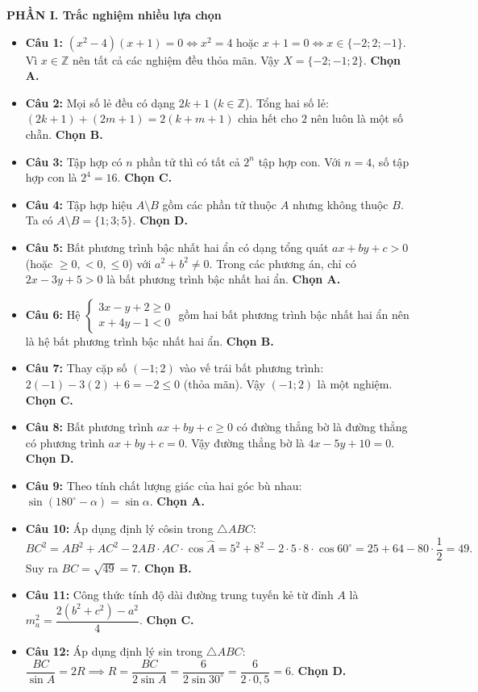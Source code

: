 \documentclass[12pt,a4paper]{article}
\begin{document}
\textbf{PHẦN I. Trắc nghiệm nhiều lựa chọn}
\begin{itemize}[leftmargin=0.6cm, itemsep=1.5pt, topsep=1pt]
    \item \textbf{Câu 1:} $(x^2 - 4)(x + 1) = 0 \iff x^2 = 4$ hoặc $x + 1 = 0 \iff x \in \{-2; 2; -1\}$. Vì $x \in \mathbb{Z}$ nên tất cả các nghiệm đều thỏa mãn. Vậy $X = \{-2; -1; 2\}$. \textbf{Chọn A.}
    \item \textbf{Câu 2:} Mọi số lẻ đều có dạng $2k + 1$ ($k \in \mathbb{Z}$). Tổng hai số lẻ: $(2k + 1) + (2m + 1) = 2(k + m + 1)$ chia hết cho $2$ nên luôn là một số chẵn. \textbf{Chọn B.}
    \item \textbf{Câu 3:} Tập hợp có $n$ phần tử thì có tất cả $2^n$ tập hợp con. Với $n = 4$, số tập hợp con là $2^4 = 16$. \textbf{Chọn C.}
    \item \textbf{Câu 4:} Tập hợp hiệu $A \setminus B$ gồm các phần tử thuộc $A$ nhưng không thuộc $B$. Ta có $A \setminus B = \{1; 3; 5\}$. \textbf{Chọn D.}
    \item \textbf{Câu 5:} Bất phương trình bậc nhất hai ẩn có dạng tổng quát $ax + by + c > 0$ (hoặc $\ge 0, < 0, \le 0$) với $a^2 + b^2 \ne 0$. Trong các phương án, chỉ có $2x - 3y + 5 > 0$ là bất phương trình bậc nhất hai ẩn. \textbf{Chọn A.}
    \item \textbf{Câu 6:} Hệ $\begin{cases} 3x - y + 2 \ge 0 \\ x + 4y - 1 < 0 \end{cases}$ gồm hai bất phương trình bậc nhất hai ẩn nên là hệ bất phương trình bậc nhất hai ẩn. \textbf{Chọn B.}
    \item \textbf{Câu 7:} Thay cặp số $(-1; 2)$ vào vế trái bất phương trình: $2(-1) - 3(2) + 6 = -2 \le 0$ (thỏa mãn). Vậy $(-1; 2)$ là một nghiệm. \textbf{Chọn C.}
    \item \textbf{Câu 8:} Bất phương trình $ax + by + c \ge 0$ có đường thẳng bờ là đường thẳng có phương trình $ax + by + c = 0$. Vậy đường thẳng bờ là $4x - 5y + 10 = 0$. \textbf{Chọn D.}
    \item \textbf{Câu 9:} Theo tính chất lượng giác của hai góc bù nhau: $\sin(180^\circ - \alpha) = \sin \alpha$. \textbf{Chọn A.}
    \item \textbf{Câu 10:} Áp dụng định lý côsin trong $\triangle ABC$:
    \[
    BC^2 = AB^2 + AC^2 - 2 AB \cdot AC \cdot \cos \widehat{A} = 5^2 + 8^2 - 2 \cdot 5 \cdot 8 \cdot \cos 60^\circ = 25 + 64 - 80 \cdot \dfrac{1}{2} = 49.
    \]
    Suy ra $BC = \sqrt{49} = 7$. \textbf{Chọn B.}
    \item \textbf{Câu 11:} Công thức tính độ dài đường trung tuyến kẻ từ đỉnh $A$ là $m_a^2 = \dfrac{2(b^2 + c^2) - a^2}{4}$. \textbf{Chọn C.}
    \item \textbf{Câu 12:} Áp dụng định lý sin trong $\triangle ABC$: $\dfrac{BC}{\sin A} = 2R \implies R = \dfrac{BC}{2\sin A} = \dfrac{6}{2 \sin 30^\circ} = \dfrac{6}{2 \cdot 0{,}5} = 6$. \textbf{Chọn D.}
\end{itemize}
\end{document}
